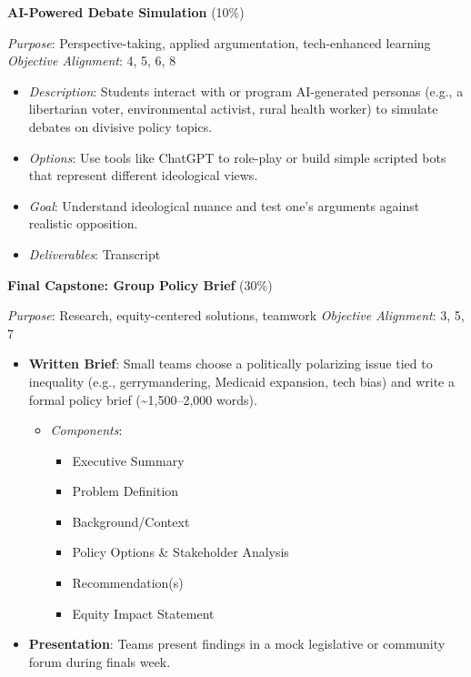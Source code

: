 \documentclass[]{tufte-handout}
\providecommand{\tightlist}{%
  \setlength{\itemsep}{0pt}\setlength{\parskip}{0pt}}
\begin{document}
\textbf{AI-Powered Debate Simulation} (10\%)

\emph{Purpose}: Perspective-taking, applied argumentation, tech-enhanced
learning\\
\emph{Objective Alignment}: 4, 5, 6, 8

\begin{itemize}
\tightlist
\item
  \emph{Description}: Students interact with or program AI-generated
  personas (e.g., a libertarian voter, environmental activist, rural
  health worker) to simulate debates on divisive policy topics.
\item
  \emph{Options}: Use tools like ChatGPT to role-play or build simple
  scripted bots that represent different ideological views.
\item
  \emph{Goal}: Understand ideological nuance and test one's arguments
  against realistic opposition.
\item
  \emph{Deliverables}: Transcript
\end{itemize}

\textbf{Final Capstone: Group Policy Brief} (30\%)

\emph{Purpose}: Research, equity-centered solutions, teamwork
\emph{Objective Alignment}: 3, 5, 7

\begin{itemize}
\tightlist
\item
  \textbf{Written Brief}: Small teams choose a politically polarizing
  issue tied to inequality (e.g., gerrymandering, Medicaid expansion,
  tech bias) and write a formal policy brief
  (\textasciitilde1,500--2,000 words).

  \begin{itemize}
  \tightlist
  \item
    \emph{Components}:

    \begin{itemize}
    \tightlist
    \item
      Executive Summary
    \item
      Problem Definition
    \item
      Background/Context
    \item
      Policy Options \& Stakeholder Analysis
    \item
      Recommendation(s)
    \item
      Equity Impact Statement
    \end{itemize}
  \end{itemize}
\item
  \textbf{Presentation}: Teams present findings in a mock legislative or
  community forum during finals week.
\end{itemize}
\end{document}
